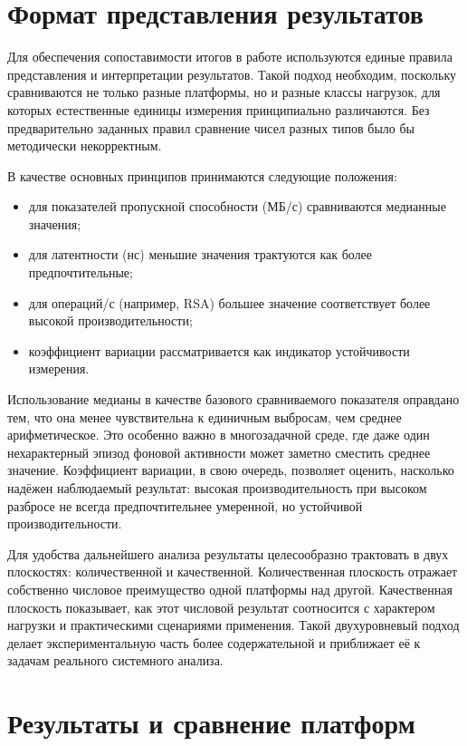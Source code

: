 \section{Формат представления результатов}

Для обеспечения сопоставимости итогов в работе используются единые правила представления и интерпретации результатов. Такой подход необходим, поскольку сравниваются не только разные платформы, но и разные классы нагрузок, для которых естественные единицы измерения принципиально различаются. Без предварительно заданных правил сравнение чисел разных типов было бы методически некорректным.

В качестве основных принципов принимаются следующие положения:
\begin{itemize}
    \item для показателей пропускной способности (МБ/с) сравниваются медианные значения;
    \item для латентности (нс) меньшие значения трактуются как более предпочтительные;
    \item для операций/с (например, RSA) большее значение соответствует более высокой производительности;
    \item коэффициент вариации рассматривается как индикатор устойчивости измерения.
\end{itemize}

Использование медианы в качестве базового сравниваемого показателя оправдано тем, что она менее чувствительна к единичным выбросам, чем среднее арифметическое. Это особенно важно в многозадачной среде, где даже один нехарактерный эпизод фоновой активности может заметно сместить среднее значение. Коэффициент вариации, в свою очередь, позволяет оценить, насколько надёжен наблюдаемый результат: высокая производительность при высоком разбросе не всегда предпочтительнее умеренной, но устойчивой производительности.

Для удобства дальнейшего анализа результаты целесообразно трактовать в двух плоскостях: количественной и качественной. Количественная плоскость отражает собственно числовое преимущество одной платформы над другой. Качественная плоскость показывает, как этот числовой результат соотносится с характером нагрузки и практическими сценариями применения. Такой двухуровневый подход делает экспериментальную часть более содержательной и приближает её к задачам реального системного анализа.

\section{Результаты и сравнение платформ}

